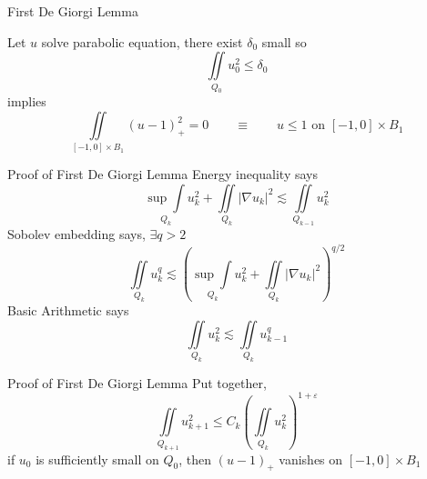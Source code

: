 \documentclass{beamer}
\newcommand{\N}{\mathbb{N}}
\newcommand{\eps}{\varepsilon}
\newcommand{\paren}[1]{\left( #1 \right)}
\newcommand{\grad}{\nabla}
\begin{document}


\begin{frame}{First De Giorgi Lemma}
\begin{lemma}
Let $u$ solve parabolic equation, there exist $\delta_0$ small so
\[ \iint\limits_{Q_0} u_0^2 \leq \delta_0 \]
implies 
\[ \iint\limits_{[-1,0]\times B_1} (u-1)_+^2 = 0 \qquad \equiv \qquad u \leq 1 \textrm{ on } [-1,0]\times B_1 \]
\end{lemma}

\end{frame}


\begin{frame}{Proof of First De Giorgi Lemma}
Energy inequality says
\[ \underset{Q_k}{\sup \int} u_k^2 + \iint\limits_{Q_k} |\grad u_k|^2 \lesssim \iint\limits_{Q_{k-1}} u_k^2 \]
\pause
Sobolev embedding says, $\exists q > 2$
\[ \iint\limits_{Q_k} u_k^q \lesssim \paren{ \underset{Q_k}{\sup \int} u_k^2 + \iint\limits_{Q_k} |\grad u_k|^2 }^{q/2} \]
\pause
Basic Arithmetic says
\[ \iint\limits_{Q_k} u_k^2 \lesssim \iint\limits_{Q_k} u_{k-1}^q \]

\end{frame}


\begin{frame}{Proof of First De Giorgi Lemma}
Put together, 
\[ \iint\limits_{Q_{k+1}} u_{k+1}^2 \leq C_k \paren{ \iint\limits_{Q_k} u_k^2 }^{1+\eps} \]
if $u_0$ is sufficiently small on $Q_0$, then $(u-1)_+$ vanishes on $[-1,0]\times B_1$
\end{frame}
\end{document}
